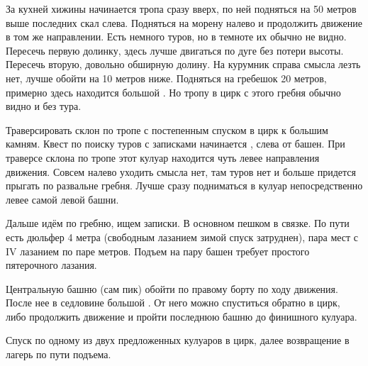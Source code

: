 За кухней хижины \geoLighthouse начинается тропа сразу вверх, по ней
подняться на 50 метров выше последних скал слева. Подняться на морену
налево и продолжить движение в том же направлении. Есть немного туров,
но в темноте их обычно не видно. Пересечь первую долинку, здесь лучше
двигаться по дуге без потери высоты. Пересечь вторую, довольно
обширную долину. На курумник справа смысла лезть нет, лучше обойти на
10 метров ниже. Подняться на гребешок 20 метров, примерно здесь
находится большой \geoStartOfKoshevoy[тур]. Но тропу в цирк
\geoPeakKoshevoy с этого гребня обычно видно и без тура.

Траверсировать склон по тропе с постепенным спуском в цирк к большим
камням. Квест по поиску туров с записками начинается
, слева от башен.
При траверсе склона по тропе этот кулуар находится чуть левее
направления движения. Совсем налево уходить смысла нет, там туров нет
и больше придется прыгать по развальне гребня. Лучше сразу подниматься
в кулуар непосредственно левее самой левой башни.

Дальше идём по гребню, ищем записки. В основном пешком в связке. По
пути есть дюльфер 4 метра (свободным лазанием зимой спуск затруднен),
пара мест с IV лазанием по паре метров. Подъем на пару башен требует
простого пятерочного лазания.

Центральную башню (сам пик) обойти по правому борту по ходу движения.
После нее в седловине большой
. От него можно
спуститься обратно в цирк, либо продолжить движение и пройти последнюю
башню до финишного кулуара.

Спуск по одному из двух предложенных кулуаров в цирк, далее
возвращение в лагерь по пути подъема.
